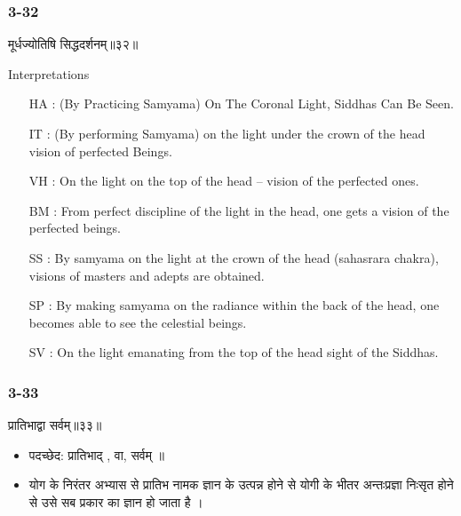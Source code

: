 \begin{frame}[fragile]\frametitle{3-32}
\begin{sanskrit}
मूर्धज्योतिषि सिद्धदर्शनम्॥३२॥
\end{sanskrit}

Interpretations
\begin{itemize}	
\item [HA]: (By Practicing Samyama) On The Coronal Light, Siddhas Can Be Seen.
\item [IT]: (By performing Samyama) on the light under the crown of the head vision of perfected Beings.
\item [VH]: On the light on the top of the head – vision of the perfected ones.
\item [BM]: From perfect discipline of the light in the head, one gets a vision of the perfected beings.
\item [SS]: By samyama on the light at the crown of the head (sahasrara chakra), visions of masters and adepts are obtained.
\item [SP]: By making samyama on the radiance within the back of the head, one becomes able to see the celestial beings.
\item [SV]: On the light emanating from the top of the head sight of the Siddhas. 
\end{itemize}
\end{frame}

\begin{frame}[fragile]\frametitle{3-33}
\begin{sanskrit}
प्रातिभाद्वा सर्वम्॥३३॥
\end{sanskrit}

\begin{itemize}
\item पदच्छेद:  ‌प्रातिभाद् , वा, सर्वम् ॥
\item योग के निरंतर अभ्यास से प्रातिभ नामक ज्ञान के उत्पन्न होने से योगी के भीतर अन्तःप्रज्ञा निःसृत होने से उसे सब प्रकार का ज्ञान हो जाता है ।
\end{itemize}
\end{frame}

